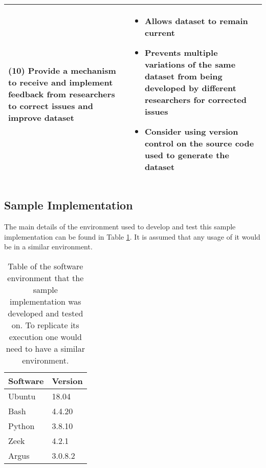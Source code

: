 \documentclass[conference]{IEEEtran}
\begin{document}
\begin{table*}
\begin{tabular}{m{8cm} m{8cm}}
    \textbf{(10) Provide a mechanism to receive and implement feedback from researchers to correct issues and improve dataset} &
        \begin{itemize}
            \item Allows dataset to remain current
            \item Prevents multiple variations of the same dataset from being developed by different researchers for corrected issues
            \item Consider using version control on the source code used to generate the dataset
        \end{itemize} \\
    \hline
\end{tabular}
\end{table*}
\endgroup

\subsection{Sample Implementation}\label{subsec:framework_implementation}
The main details of the environment used to develop and test this sample implementation can be found in Table \ref{tbl:software_environment}.
It is assumed that any usage of it would be in a similar environment.

\begingroup
\setlength{\tabcolsep}{10pt} %
\renewcommand{\arraystretch}{1.5} %
\begin{table}
\centering
\caption{
Table of the software environment that the sample implementation was developed and tested on.
To replicate its execution one would need to have a similar environment.
}
\label{tbl:software_environment}
\begin{tabular}{ll}
    \hline
    \textbf{Software} &  \textbf{Version} \\
    \hline
    Ubuntu & 18.04 \\
    Bash & 4.4.20 \\
    Python & 3.8.10 \\
    Zeek & 4.2.1 \\
    Argus & 3.0.8.2 \\
    \hline
\end{tabular}
\end{table}
\endgroup
\end{document}
